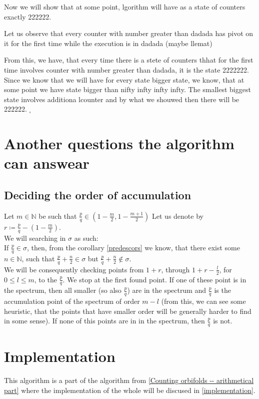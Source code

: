 Now we will show that at some point, lgorithm will have as a state of counters exactly 222222. 

Let us observe that every counter with number greater than dadada 
has pivot on it for the first time while the execution is in dadada (maybe llemat)

From this, we have, that every time there is a stete of counters thhat for the first time 
involves counter with number greater than dadada, it is the state 2222222. 
Since we know that we will have for every state bigger state, we know, that at some point we have 
state bigger than nifty infty infty infty. The smallest biggest state involves additiona lcounter 
and by what we shouwed then there will be 222222. $_\square$





\section{Another questions the algorithm can answear}
\subsection{Deciding the order of accumulation}
Let $m \in \mathbb{N}$ be such that $\frac{p}{q} \in (1-\frac{m}{2},1-
\frac{m+1}{2})$
Let us denote by $r \coloneqq \frac{p}{q} - (1-\frac{m}{2})$. \\ 

We will searching in $\sigma$ as such: \\

If $\frac{p}{q} \in \sigma$, then, from the corollary \ref{predescors} we know, that there 
exist some $n \in \mathbb{N}$, such that $\frac{p}{q} + \frac{n}{2} \in \sigma$ but 
$\frac{p}{q} + \frac{n}{2} \not\in \sigma$. \\

We will be consequently checking points from $1+r$, through $1+r-\frac{l}{2}$, for 
$0 \leq l \leq m$, to the $\frac{p}{q}$. We stop at the first found point. 
If one of these point is in the spectrum, then all smaller (so also $\frac{p}{q}$) are in 
the spectrum and $\frac{p}{q}$ is the accumulation point of the spectrum of order $m-l$ 
(from this, 
we can see some heuristic, that the points that have smaller order will be generally 
harder to find in some sense). If none of this points are in in the spectrum, then $\frac{p}{q}$ 
is not. \\

\section{Implementation}
This algorithm is a part of the algorithm from \ref{Counting orbifolds -- arithmetical part} 
where the implementation of the whole will be discused in \ref{implementation}.
